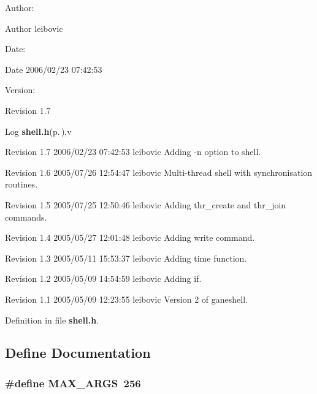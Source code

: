 \begin{Desc}
\item[Author:]\begin{Desc}
\item[Author]leibovic \end{Desc}
\end{Desc}
\begin{Desc}
\item[Date:]\begin{Desc}
\item[Date]2006/02/23 07:42:53 \end{Desc}
\end{Desc}
\begin{Desc}
\item[Version:]\begin{Desc}
\item[Revision]1.7 \end{Desc}
\end{Desc}
\begin{Desc}
\item[Log]{\bf shell.h}{\rm (p.\,\pageref{shell_8h})},v \end{Desc}
Revision 1.7 2006/02/23 07:42:53 leibovic Adding -n option to shell.

Revision 1.6 2005/07/26 12:54:47 leibovic Multi-thread shell with synchronisation routines.

Revision 1.5 2005/07/25 12:50:46 leibovic Adding thr\_\-create and thr\_\-join commands.

Revision 1.4 2005/05/27 12:01:48 leibovic Adding write command.

Revision 1.3 2005/05/11 15:53:37 leibovic Adding time function.

Revision 1.2 2005/05/09 14:54:59 leibovic Adding if.

Revision 1.1 2005/05/09 12:23:55 leibovic Version 2 of ganeshell.

Definition in file {\bf shell.h}.

\subsection{Define Documentation}
\subsubsection{\setlength{\rightskip}{0pt plus 5cm}\#define MAX\_\-ARGS\ 256}\label{shell_8h_a1}




